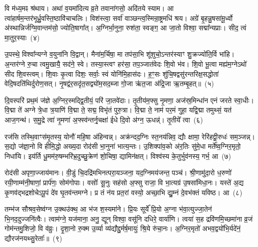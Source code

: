 वि म॑ध्य॒मꣴ श्र॑थाय। अथा॑ व॒यमा॑दित्य व्र॒ते तवाना॑गसो॒ अदि॑तये स्याम। आ त्वा॑हार्\mbox{}षम॒न्तर॑भूर्ध्रु॒वस्ति॒ष्ठा\-वि॑चाचलिः। विश॑स्त्वा॒ सर्वा॑ वाञ्छन्त्व॒स्मिन्रा॒ष्ट्रमधि॑ श्रय। अग्रे॑ बृ॒हन्नु॒षसा॑मू॒र्ध्वो अ॑स्थान्निर्जग्मि॒वान्तम॑सो॒ ज्योति॒षागा᳚त्। अ॒ग्निर्भा॒नुना॒ रुश॑ता॒ स्वङ्ग॒ आ जा॒तो विश्वा॒ सद्मा᳚न्यप्राः। सीद॒ त्वं मा॒तुर॒स्याः~(४)

उ॒पस्थे॒ विश्वा᳚न्यग्ने व॒युना॑नि वि॒द्वान्। मैना॑म॒र्चिषा॒ मा तप॑सा॒भि शू॑शुचो॒\-ऽन्तर॑स्याꣳ शु॒क्रज्यो॑ति॒र्वि भा॑हि। अ॒न्तर॑ग्ने रु॒चा त्वमु॒खायै॒ सद॑ने॒ स्वे। तस्या॒स्त्वꣳ हर॑सा॒ तप॒ञ्जात॑वेदः शि॒वो भ॑व। शि॒वो भू॒त्वा मह्य॑म॒ग्ने\-ऽथो॑ सीद शि॒वस्त्वम्। शि॒वाः कृ॒त्वा दिशः॒ सर्वाः॒ स्वं योनि॑मि॒हास॑दः। ह॒ꣳ॒सः शु॑चि॒षद्वसु॑रन्तरिक्ष॒सद्धोता॑ वेदि॒षदति॑थिर्दुरोण॒सत्। नृ॒षद्व॑र॒सदृ॑त॒सद्व्यो॑म॒सद॒ब्जा गो॒जा ऋ॑त॒जा अ॑द्रि॒जा ऋ॒तम्बृ॒हत्॥~(५)

{\anuvakamend[{दिव॒मनु॒ वि क्र॑मस्व॒ निर्भ॑क्तः॒ स यं द्वि॒ष्मो विष्णो॒र्धने॒नाग्ने॑\-ऽध॒मम॒स्याः शु॑चि॒षथ्षोड॑श च}]}%

दि॒वस्परि॑ प्रथ॒मं ज॑ज्ञे अ॒ग्निर॒स्मद्द्वि॒तीयं॒ परि॑ जा॒तवे॑दाः। तृ॒तीय॑म॒फ्सु नृ॒मणा॒ अज॑स्र॒मिन्धा॑न एनं जरते स्वा॒धीः। वि॒द्मा ते॑ अग्ने त्रे॒धा त्र॒याणि॑ वि॒द्मा ते॒ सद्म॒ विभृ॑तं पुरु॒त्रा। वि॒द्मा ते॒ नाम॑ पर॒मं गुहा॒ यद्वि॒द्मा तमुथ्सं॒ यत॑ आज॒गन्थ॑। स॒मु॒द्रे त्वा॑ नृ॒मणा॑ अ॒फ्स्व॑न्तर्नृ॒चक्षा॑ ईधे दि॒वो अ॑ग्न॒ ऊधन्न्॑। तृ॒तीये᳚ त्वा~(६)

रज॑सि तस्थि॒वाꣳस॑मृ॒तस्य॒ योनौ॑ महि॒षा अ॑हिन्वन्न्। अक्र॑न्दद॒ग्निः स्त॒नय॑न्निव॒ द्यौः क्षामा॒ रेरि॑हद्वी॒रुधः॑ सम॒ञ्जन्न्। स॒द्यो ज॑ज्ञा॒नो वि हीमि॒द्धो अख्य॒दा रोद॑सी भा॒नुना॑ भात्य॒न्तः। उ॒शिक्पा॑व॒को अ॑र॒तिः सु॑मे॒धा मर्ते᳚ष्व॒ग्निर॒मृतो॒ निधा॑यि। इय॑र्ति धू॒मम॑रु॒षम्भरि॑भ्र॒दुच्छु॒क्रेण॑ शो॒चिषा॒ द्यामिन॑क्षत्। विश्व॑स्य के॒तुर्भुव॑नस्य॒ गर्भ॒ आ~(७)

रोद॑सी अपृणा॒ज्जाय॑मानः। वी॒डुं चि॒दद्रि॑मभिनत्परा॒यञ्जना॒ यद॒ग्निमय॑जन्त॒ पञ्च॑। श्री॒णामु॑दा॒रो ध॒रुणो॑ रयी॒णाम्म॑नी॒षाणां॒ प्रार्प॑णः॒ सोम॑गोपाः। वसोः᳚ सू॒नुः सह॑सो अ॒फ्सु राजा॒ वि भा॒त्यग्र॑ उ॒षसा॑मिधा॒नः। यस्ते॑ अ॒द्य कृ॒णव॑द्भद्रशोचे\-ऽपू॒पं दे॑व घृ॒तव॑न्तमग्ने। प्र तं न॑य प्रत॒रां वस्यो॒ अच्छा॒भि द्यु॒म्नं दे॒वभ॑क्तं यविष्ठ। आ~(८)

तम्भ॑ज सौश्रव॒सेष्व॑ग्न उ॒क्थउ॑क्थ॒ आ भ॑ज श॒स्यमा॑ने। प्रि॒यः सूर्ये᳚ प्रि॒यो अ॒ग्ना भ॑वा॒त्युज्जा॒तेन॑ भि॒नद॒दुज्जनि॑त्वैः। त्वाम॑ग्ने॒ यज॑माना॒ अनु॒ द्यून् विश्वा॒ वसू॑नि दधिरे॒ वार्या॑णि। त्वया॑ स॒ह द्रवि॑णमि॒च्छमा॑ना व्र॒जं गोम॑न्तमु॒शिजो॒ वि व॑व्रुः। दृ॒शा॒नो रु॒क्म उ॒र्व्या व्य॑द्यौद्दु॒र्मर्\mbox{}ष॒मायुः॑ श्रि॒ये रु॑चा॒नः। अ॒ग्निर॒मृतो॑ अभव॒द्वयो॑भि॒र्यदे॑नं॒ द्यौरज॑नयथ्सु॒रेताः᳚॥~(९)

